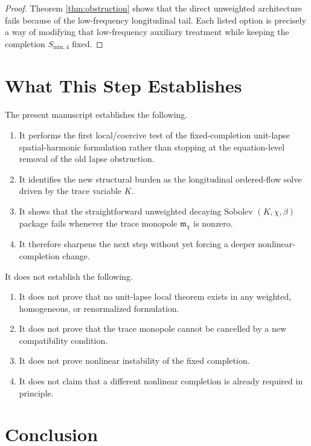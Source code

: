 \documentclass[11pt]{article}
\begin{document}
\begin{proof}
Theorem \ref{thm:obstruction} shows that the direct unweighted architecture fails because of the low-frequency longitudinal tail. Each listed option is precisely a way of modifying that low-frequency auxiliary treatment while keeping the completion \(S_{\mathrm{min},4}\) fixed.
\end{proof}

\section{What This Step Establishes}

The present manuscript establishes the following.
\begin{enumerate}
    \item It performs the first local/coercive test of the fixed-completion unit-lapse spatial-harmonic formulation rather than stopping at the equation-level removal of the old lapse obstruction.
    \item It identifies the new structural burden as the longitudinal ordered-flow solve driven by the trace variable \(K\).
    \item It shows that the straightforward unweighted decaying Sobolev \((K,\chi,\beta)\) package fails whenever the trace monopole \(\mathfrak m_\chi\) is nonzero.
    \item It therefore sharpens the next step without yet forcing a deeper nonlinear-completion change.
\end{enumerate}

It does not establish the following.
\begin{enumerate}
    \item It does not prove that no unit-lapse local theorem exists in any weighted, homogeneous, or renormalized formulation.
    \item It does not prove that the trace monopole cannot be cancelled by a new compatibility condition.
    \item It does not prove nonlinear instability of the fixed completion.
    \item It does not claim that a different nonlinear completion is already required in principle.
\end{enumerate}

\section{Conclusion}
\end{document}
